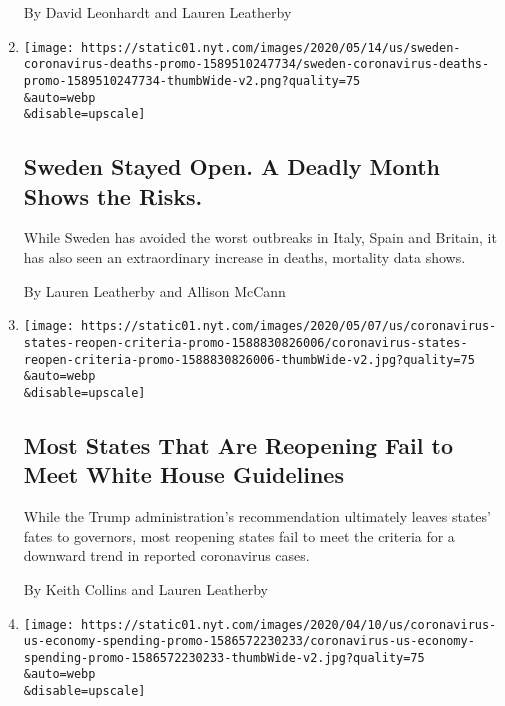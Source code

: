 \begin{enumerate}
  By David Leonhardt and Lauren Leatherby
\item
  \href{/interactive/2020/05/15/world/europe/sweden-coronavirus-deaths.html}{}

  \texttt{[image: https://static01.nyt.com/images/2020/05/14/us/sweden-coronavirus-deaths-promo-1589510247734/sweden-coronavirus-deaths-promo-1589510247734-thumbWide-v2.png?quality=75\\\&auto=webp\\\&disable=upscale]}

  \hypertarget{sweden-stayed-open-a-deadly-month-shows-the-risks}{%
  \subsection{Sweden Stayed Open. A Deadly Month Shows the
  Risks.}\label{sweden-stayed-open-a-deadly-month-shows-the-risks}}

  While Sweden has avoided the worst outbreaks in Italy, Spain and
  Britain, it has also seen an extraordinary increase in deaths,
  mortality data shows.

  By Lauren Leatherby and Allison McCann
\item
  \href{/interactive/2020/05/07/us/coronavirus-states-reopen-criteria.html}{}

  \texttt{[image: https://static01.nyt.com/images/2020/05/07/us/coronavirus-states-reopen-criteria-promo-1588830826006/coronavirus-states-reopen-criteria-promo-1588830826006-thumbWide-v2.jpg?quality=75\\\&auto=webp\\\&disable=upscale]}

  \hypertarget{most-states-that-are-reopening-fail-to-meet-white-house-guidelines}{%
  \subsection{Most States That Are Reopening Fail to Meet White House
  Guidelines}\label{most-states-that-are-reopening-fail-to-meet-white-house-guidelines}}

  While the Trump administration's recommendation ultimately leaves
  states' fates to governors, most reopening states fail to meet the
  criteria for a downward trend in reported coronavirus cases.

  By Keith Collins and Lauren Leatherby
\item
  \href{/interactive/2020/04/11/business/economy/coronavirus-us-economy-spending.html}{}

  \texttt{[image: https://static01.nyt.com/images/2020/04/10/us/coronavirus-us-economy-spending-promo-1586572230233/coronavirus-us-economy-spending-promo-1586572230233-thumbWide-v2.jpg?quality=75\\\&auto=webp\\\&disable=upscale]}


\end{enumerate}
